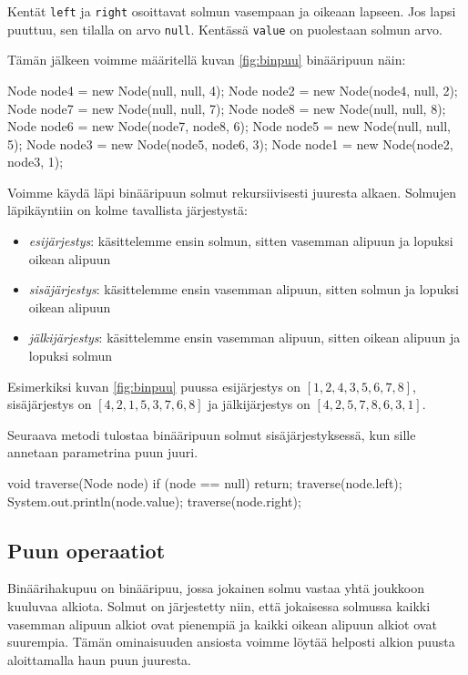Kentät \texttt{left} ja \texttt{right} osoittavat solmun
vasempaan ja oikeaan lapseen.
Jos lapsi puuttuu, sen tilalla on arvo \texttt{null}.
Kentässä \texttt{value} on puolestaan solmun arvo.

Tämän jälkeen voimme määritellä kuvan \ref{fig:binpuu}
binääripuun näin:

\begin{code}
Node node4 = new Node(null, null, 4);
Node node2 = new Node(node4, null, 2);
Node node7 = new Node(null, null, 7);
Node node8 = new Node(null, null, 8);
Node node6 = new Node(node7, node8, 6);
Node node5 = new Node(null, null, 5);
Node node3 = new Node(node5, node6, 3);
Node node1 = new Node(node2, node3, 1);
\end{code}

Voimme käydä läpi binääripuun solmut rekursiivisesti
juuresta alkaen.
Solmujen läpikäyntiin on kolme tavallista järjestystä:

\begin{itemize}
\item \emph{esijärjestys}: käsittelemme ensin solmun, sitten vasemman alipuun
ja lopuksi oikean alipuun
\item \emph{sisäjärjestys}: käsittelemme ensin vasemman alipuun, sitten solmun
ja lopuksi oikean alipuun
\item \emph{jälkijärjestys}: käsittelemme ensin vasemman alipuun,
sitten oikean alipuun ja lopuksi solmun
\end{itemize}

Esimerkiksi kuvan \ref{fig:binpuu} puussa
esijärjestys on $[1,2,4,3,5,6,7,8]$,
sisäjärjes\-tys on $[4,2,1,5,3,7,6,8]$ ja
jälkijärjestys on $[4,2,5,7,8,6,3,1]$.

Seuraava metodi tulostaa binääripuun solmut
sisäjärjestyksessä, kun sille annetaan parametrina
puun juuri.

\begin{code}
void traverse(Node node) {
    if (node == null) return;
    traverse(node.left);
    System.out.println(node.value);
    traverse(node.right);
}
\end{code}

\subsection{Puun operaatiot}

Binäärihakupuu on binääripuu, jossa jokainen solmu vastaa
yhtä joukkoon kuuluvaa alkiota.
Solmut on järjestetty niin, että jokaisessa solmussa
kaikki vasemman alipuun alkiot ovat pienempiä
ja kaikki oikean alipuun alkiot ovat suurempia.
Tämän ominaisuuden ansiosta voimme löytää helposti
alkion puusta aloittamalla haun puun juuresta.

